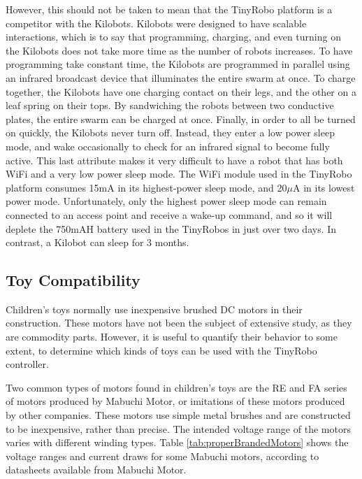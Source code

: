 \documentclass[]{article}
\begin{document}
However, this should not be taken to mean that the TinyRobo platform is a competitor with the Kilobots. 
Kilobots were designed to have scalable interactions, which is to say that programming, charging, and even turning on the Kilobots does not take more time as the number of robots increases. 
To have programming take constant time, the Kilobots are programmed in parallel using an infrared broadcast device that illuminates the entire swarm at once. 
To charge together, the Kilobots have one charging contact on their legs, and the other on a leaf spring on their tops. 
By sandwiching the robots between two conductive plates, the entire swarm can be charged at once.
Finally, in order to all be turned on quickly, the Kilobots never turn off.  
Instead, they enter a low power sleep mode, and wake occasionally to check for an infrared signal to become fully active. 
This last attribute makes it very difficult to have a robot that has both WiFi and a very low power sleep mode. 
The WiFi module used in the TinyRobo platform consumes 15mA in its highest-power sleep mode, and 20$\mu$A in its lowest power mode. 
Unfortunately, only the highest power sleep mode can remain connected to an access point and receive a wake-up command, and so it will deplete the 750mAH battery used in the TinyRobos in just over two days. 
In contrast, a Kilobot can sleep for 3 months. 

\subsection{Toy Compatibility}

Children's toys normally use inexpensive brushed DC motors in their construction. 
These motors have not been the subject of extensive study, as they are commodity parts. 
However, it is useful to quantify their behavior to some extent, to determine which kinds of toys can be used with the TinyRobo controller. 

Two common types of motors found in children's toys are the RE and FA series of motors produced by Mabuchi Motor, or imitations of these motors produced by other companies. 
These motors use simple metal brushes and are constructed to be inexpensive, rather than precise. 
The intended voltage range of the motors varies with different winding types. 
Table \ref{tab:properBrandedMotors} shows the voltage ranges and current draws for some Mabuchi motors, according to datasheets available from Mabuchi Motor.
\end{document}
